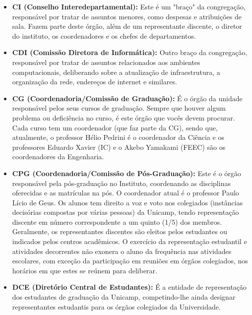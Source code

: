\begin{itemize}
\item  \textbf{CI (Conselho Interedepartamental):} Este é um "braço" da congregação, responsável por tratar de assuntos menores, como despesas e atribuições de sala. Fazem parte deste órgão, além de um representante discente, o diretor do instituto, os coordenadores e os chefes de departamentos.
\end{itemize}

\begin{itemize}
\item  \textbf{CDI (Comissão Diretora de Informática):} Outro braço da congregação, responsável por tratar de assuntos relacionados aos ambientes computacionais, deliberando sobre a atualização de infraestrutura, a organização da rede, endereços de internet e similares.
\end{itemize}

\begin{itemize}
\item  \textbf{CG (Coordenadoria/Comissão de Graduação):} É o órgão da unidade responsável pelos seus cursos de graduação. Sempre que houver algum problema ou deficiência no curso, é este órgão que vocês devem procurar. Cada curso tem um coordenador (que faz parte da CG), sendo que, atualmente, o professor Hélio Pedrini é o coordenador da Ciência e os professores Eduardo Xavier (IC) e o Akebo Yamakami (FEEC) são os coordenadores da Engenharia.
\end{itemize}

\begin{itemize}
\item  \textbf{CPG (Coordenadoria/Comissão de Pós-Graduação):} Este é o órgão responsável pela pós-graduação no Instituto, coordenando as disciplinas oferecidas e as matrículas na pós. O coordenador atual é o professor Paulo Lício de Geus. Os alunos tem direito a voz e voto nos colegiados (instâncias decisórias compostas por várias pessoas) da Unicamp, tendo representação discente em número correspondente a um quinto (1/5) dos membros. Geralmente, os representantes discentes são eleitos pelos estudantes ou indicados pelos centros acadêmicos. O exercício da representação estudantil e atividades decorrentes não exonera o aluno da frequência nas atividades escolares, com exceção da participação em reuniões em órgãos colegiados, nos horários em que estes se reúnem para deliberar.
\end{itemize}

\begin{itemize}
\item  \textbf{DCE (Diretório Central de Estudantes):} É a entidade de representação dos estudantes de graduação da Unicamp, competindo-lhe ainda designar representantes estudantis para os órgãos colegiados da Universidade.
\end{itemize}


